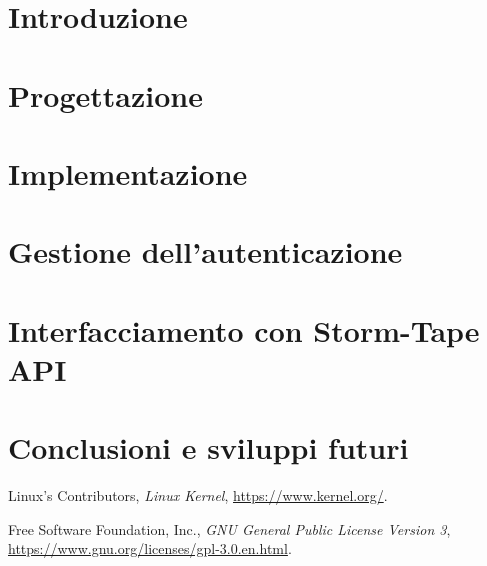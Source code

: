 \documentclass[12pt,a4paper,openright,twoside]{report}
\begin{document}
\clearpage{\pagestyle{empty}\cleardoublepage}
\tableofcontents
{}
\listoffigures
\clearpage{\pagestyle{empty}\cleardoublepage}
\listoftables
\clearpage{\pagestyle{empty}\cleardoublepage}

\clearpage{\pagestyle{empty}\cleardoublepage}

\chapter{Introduzione}
\lhead[\fancyplain{}{\bfseries\thepage}]{\fancyplain{}{\bfseries\rightmark}}


\chapter{Progettazione}
\lhead[\fancyplain{}{\bfseries\thepage}]{\fancyplain{}{\bfseries\rightmark}}


\chapter{Implementazione}
\lhead[\fancyplain{}{\bfseries\thepage}]{\fancyplain{}{\bfseries\rightmark}}


\chapter{Gestione dell'autenticazione}
\lhead[\fancyplain{}{\bfseries\thepage}]{\fancyplain{}{\bfseries\rightmark}}


\chapter{Interfacciamento con Storm-Tape API}
\lhead[\fancyplain{}{\bfseries\thepage}]{\fancyplain{}{\bfseries\rightmark}}


\chapter{Conclusioni e sviluppi futuri}
\lhead[\fancyplain{}{\bfseries\thepage}]{\fancyplain{}{\bfseries\rightmark}}


\begin{thebibliography}{99}
	Linux's Contributors,
	\textit{Linux Kernel},
	\url{https://www.kernel.org/}.

	Free Software Foundation, Inc.,
	\textit{GNU General Public License Version 3},
	\url{https://www.gnu.org/licenses/gpl-3.0.en.html}.

\end{thebibliography}
\end{document}
